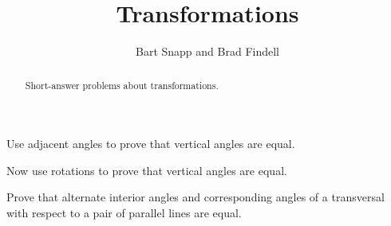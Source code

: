 \documentclass[nooutcomes]{ximera}
\title{Transformations}
\author{Bart Snapp and Brad Findell}
\begin{document}
\begin{abstract}
Short-answer problems about transformations. 
\end{abstract}
\maketitle






\begin{question}
Use adjacent angles to prove that vertical angles are equal.    
\end{question}

\begin{question}
Now use rotations to prove that vertical angles are equal.

\end{question}

\begin{question}
Prove that alternate interior angles and corresponding angles of a transversal with respect to a pair of parallel lines are equal.
\end{question}
\end{document}
